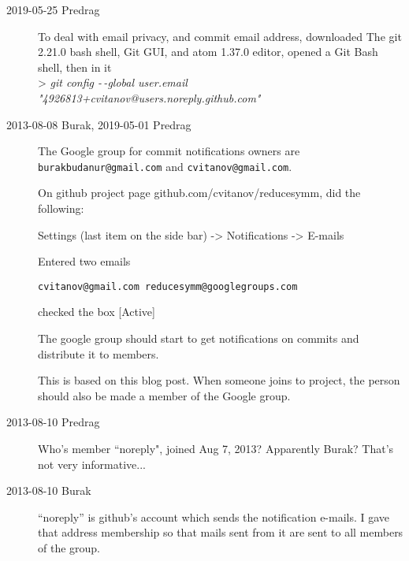 \begin{description}

\item[2019-05-25 Predrag]
To deal with 
{email privacy}, and
{commit email address},
downloaded
The  {git 2.21.0} bash shell, Git GUI,
and 
{atom 1.37.0} editor,
opened a Git Bash shell, then in it
\\
> \emph{git config -\,-global user.email "4926813+cvitanov@users.noreply.github.com"}


\item[2013-08-08 Burak, 2019-05-01 Predrag]
The  {Google
group} for  commit notifications owners are
\texttt{burakbudanur@gmail.com} and \texttt{cvitanov@gmail.com}.

On github project page
{github.com/cvitanov/reducesymm}, did the following:

Settings (last item on the side bar) -> Notifications -> E-mails

Entered two emails

\texttt{cvitanov@gmail.com
reducesymm@googlegroups.com}

checked the box [Active]

The google group should start to get notifications on commits and
distribute it to members.
%

This is based on
{this blog post}.
When someone joins
to project, the person should also be made a member of the
 {Google group}.

\item[2013-08-10 Predrag]
Who's member ``noreply", joined Aug 7, 2013? Apparently Burak? That's not very informative...

\item[2013-08-10 Burak]
``noreply'' is github's account which sends the notification e-mails. I gave that address membership so that mails sent from it are sent
to all members of the group.


\end{description}
